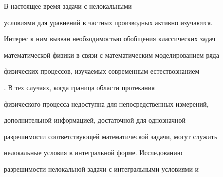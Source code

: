 











\date{24/VII/2013}




\maketitle



\small



 В настоящее время задачи с нелокальными

условиями для уравнений в частных производных активно изучаются.

Интерес к ним вызван необходимостью обобщения классических задач

математической физики в связи с математическим моделированием ряда

физических процессов, изучаемых современным естествознанием

\cite{kir:sam}. В тех случаях, когда граница области протекания

физического процесса недоступна для непосредственных измерений,

дополнительной информацией, достаточной для однозначной

разрешимости соответствующей математической задачи, могут служить

нелокальные условия в интегральной форме. Исследованию

разрешимости нелокальной задачи с интегральными условиями и

